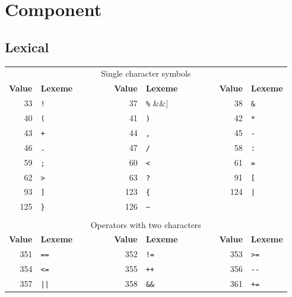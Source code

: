 \documentclass{article}
\begin{document}
\section{Component}
    \subsection{Lexical}
        \begin{table}[t]
        	\centering
        	\begin{tabular}{rlcrlcrl}
        		\multicolumn{8}{c}{Single character symbols}
        		\\[1mm]
        		{\bf Value} & {\bf Lexeme}
        		& ~~~~~~ &
        		{\bf Value} & {\bf Lexeme}
        		& ~~~~~~ &
        		{\bf Value} & {\bf Lexeme}
        		\\ \cline{1-2} \cline{4-5} \cline{7-8}
        		33 & \verb|!| &&
        		37 & \verb|%| &&
        		38 & \verb|&| \\
        		40 & \verb|(| &&
        		41 & \verb|)| &&
        		42 & \verb|*| \\
        		43 & \verb|+| &&
        		44 & \verb|,| &&
        		45 & \verb|-| \\
        		46 & \verb|.| &&
        		47 & \verb|/| &&
        		58 & \verb|:| \\
        		59 & \verb|;| &&
        		60 & \verb|<| &&
        		61 & \verb|=| \\
        		62 & \verb|>| &&
        		63 & \verb|?| &&
        		91 & \verb|[| \\
        		93 & \verb|]| &&
        		123 & \verb|{| &&
        		124 & \verb+|+ \\
        		125 & \verb|}| &&
        		126 & \verb|~| \\
        	\\
        		\multicolumn{8}{c}{Operators with two characters}
        		\\[1mm]
        		{\bf Value} & {\bf Lexeme}
        		& ~~~~~~ &
        		{\bf Value} & {\bf Lexeme}
        		& ~~~~~~ &
        		{\bf Value} & {\bf Lexeme}
        		\\ \cline{1-2} \cline{4-5} \cline{7-8}
        		351 & \verb|==| &&
        		352 & \verb|!=| &&
        		353 & \verb|>=| \\
        		354 & \verb|<=| &&
        		355 & \verb|++| &&
        		356 & \verb|--| \\
        		357 & \verb+||+ &&
        		358 & \verb|&&| &&
        		361 & \verb|+=| \\

\end{tabular}
\end{table}
\end{document}
